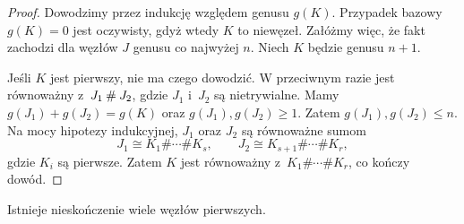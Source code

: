 \begin{proof}
    Dowodzimy przez indukcję względem genusu $g(K)$.
    Przypadek bazowy $g(K) = 0$ jest oczywisty, gdyż wtedy $K$ to niewęzeł.
    Załóżmy więc, że fakt zachodzi dla węzłów $J$ genusu co najwyżej $n$.
    Niech $K$ będzie genusu $n + 1$.

    Jeśli $K$ jest pierwszy, nie ma czego dowodzić.
    W przeciwnym razie jest równoważny z~$J_1 \mathbin{\#} J_2$, gdzie $J_1$ i~$J_2$ są nietrywialne.
    Mamy $g(J_1)+g(J_2)=g(K)$ oraz $g(J_1),g(J_2)\geqslant 1$.
    Zatem $g(J_1),g(J_2)\leqslant n$.
    Na mocy hipotezy indukcyjnej, $J_1$ oraz $J_2$ są równoważne sumom
    \[
        J_1 \cong K_1\#\cdots\# K_s,\qquad
        J_2 \cong K_{s+1}\#\cdots\# K_r,
    \]
    gdzie $K_i$ są pierwsze.
    Zatem $K$ jest równoważny z~$K_1\#\cdots\# K_r$, co kończy dowód.
\end{proof}

\begin{proposition}
\label{infty_primes}
    Istnieje nieskończenie wiele węzłów pierwszych.
\end{proposition}

